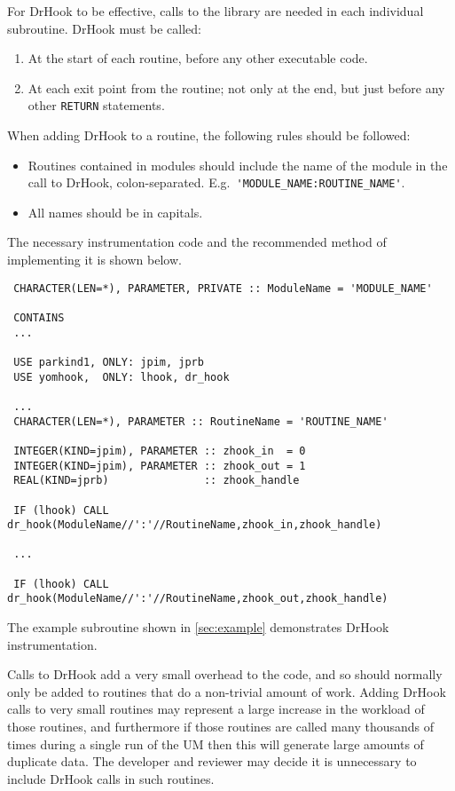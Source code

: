 \noindent For DrHook to be effective, calls to the library are needed in each individual subroutine.
DrHook must be called:

\begin{enumerate}
  \item At the start of each routine, before any other executable code.
  \item At each exit point from the routine; not only at the end, but
        just before any other \verb!RETURN! statements.
\end{enumerate}

When adding DrHook to a routine, the following rules should be followed:

\begin{itemize}
  \item Routines contained in modules should include the name of the module in
        the call to DrHook, colon-separated. E.g.\
        \verb!'MODULE_NAME:ROUTINE_NAME'!.
  \item All names should be in capitals.
\end{itemize}

The necessary instrumentation code and the recommended method of implementing it
is shown below.

\begin{verbatim}
 CHARACTER(LEN=*), PARAMETER, PRIVATE :: ModuleName = 'MODULE_NAME'

 CONTAINS
 ...

 USE parkind1, ONLY: jpim, jprb
 USE yomhook,  ONLY: lhook, dr_hook

 ...
 CHARACTER(LEN=*), PARAMETER :: RoutineName = 'ROUTINE_NAME'

 INTEGER(KIND=jpim), PARAMETER :: zhook_in  = 0
 INTEGER(KIND=jpim), PARAMETER :: zhook_out = 1
 REAL(KIND=jprb)               :: zhook_handle

 IF (lhook) CALL dr_hook(ModuleName//':'//RoutineName,zhook_in,zhook_handle)

 ...

 IF (lhook) CALL dr_hook(ModuleName//':'//RoutineName,zhook_out,zhook_handle)
\end{verbatim}

The example subroutine shown in \ref{sec:example} demonstrates DrHook
instrumentation.

Calls to DrHook add a very small overhead to the code, and so should normally
only be added to routines that do a non-trivial amount of work. Adding DrHook
calls to very small routines may represent a large increase in the workload of
those routines, and furthermore if those routines are called many thousands of
times during a single run of the UM then this will generate large amounts of
duplicate data. The developer and reviewer may decide it is unnecessary to
include DrHook calls in such routines.

